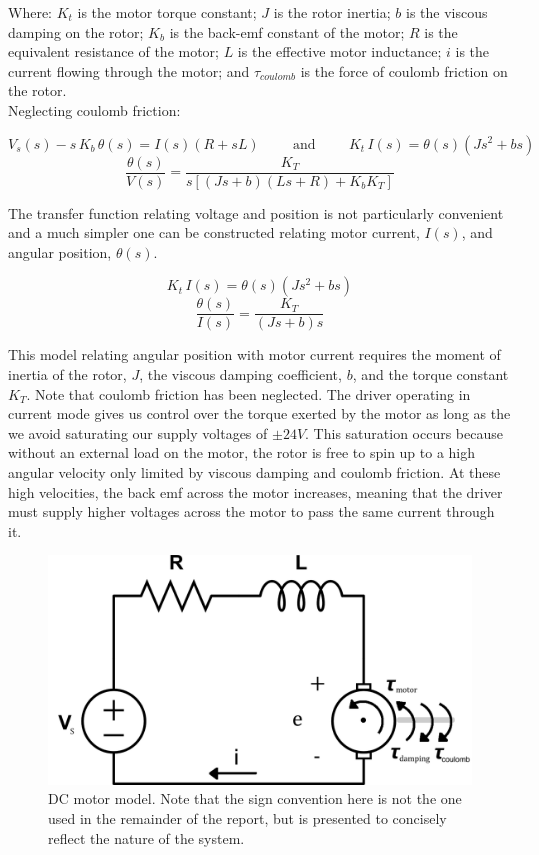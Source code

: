 \documentclass{article}
\theoremstyle{plain}
\theoremstyle{definition}
\theoremstyle{remark}
\begin{document}
Where: $K_{t}$ is the motor torque constant; $J$ is the rotor inertia; $b$ is the viscous damping on the rotor; $K_{b}$ is the back-emf constant of the motor; $R$ is the equivalent resistance of the motor; $L$ is the effective motor inductance; $i$ is the current flowing through the motor; and $\tau_{coulomb}$ is the force of coulomb friction on the rotor. \\

Neglecting coulomb friction:

$$ V_{s}(s) - s \, K_{b} \, \theta (s) = I(s) (R+sL) \hspace{1cm} \text{and} \hspace{1cm} K_{t} \, I(s) = \theta(s)(Js^2+bs) $$
$$ \frac{\theta(s)}{V(s)} = \frac{K_T}{s\left[ (Js + b)(Ls + R)+K_bK_T \right]} $$

The transfer function relating voltage and position is not particularly convenient and a much simpler one can be constructed relating motor current, $I(s)$, and angular position, $\theta (s)$. 

$$ K_{t} \, I(s) = \theta(s)(Js^2+bs) $$
$$ \frac{\theta(s)}{I(s)} = \frac{K_T}{(Js + b)s} $$

This model relating angular position with motor current requires the moment of inertia of the rotor, $J$, the viscous damping coefficient, $b$, and the torque constant $K_T$.  Note that coulomb friction has been neglected.  The driver operating in current mode gives us control over the torque exerted by the motor as long as the we avoid saturating our supply voltages of $\pm 24 V$.  This saturation occurs because without an external load on the motor, the rotor is free to spin up to a high angular velocity only limited by viscous damping and coulomb friction.  At these high velocities, the back emf across the motor increases, meaning that the driver must supply higher voltages across the motor to pass the same current through it.\\

\begin{figure}[htb]
\begin{center}
\includegraphics[width = 13cm]{dcmotor.png}
\caption{DC motor model.  Note that the sign convention here is not the one used in the remainder of the report, but is presented to concisely reflect the nature of the system.}
\label{q2_a1}
\end{center}
\end{figure}
\end{document}
